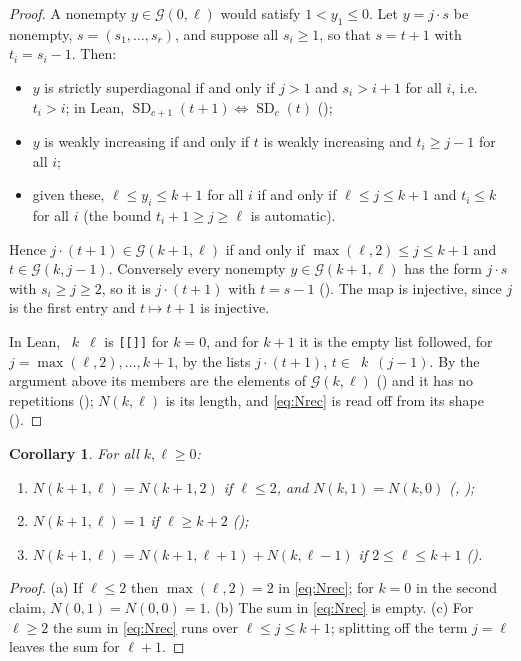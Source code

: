 \documentclass[11pt]{amsart}
\theoremstyle{plain}
\newtheorem{corollary}[theorem]{Corollary}
\theoremstyle{definition}
\newcommand{\G}{\mathcal{G}}
\begin{document}
\begin{proof}
A nonempty $y\in\G(0,\ell)$ would satisfy $1<y_1\le0$. Let $y=j\cdot s$ be nonempty, $s=(s_1,\dots,s_r)$, and suppose all $s_i\ge1$, so that $s=t+1$ with $t_i=s_i-1$. Then:
\begin{itemize}
\item $y$ is strictly superdiagonal if and only if $j>1$ and $s_i>i+1$ for all $i$, i.e.\ $t_i>i$; in Lean, $\operatorname{SD}_{c+1}(t+1)\iff\operatorname{SD}_c(t)$ ();
\item $y$ is weakly increasing if and only if $t$ is weakly increasing and $t_i\ge j-1$ for all $i$;
\item given these, $\ell\le y_i\le k+1$ for all $i$ if and only if $\ell\le j\le k+1$ and $t_i\le k$ for all $i$ (the bound $t_i+1\ge j\ge\ell$ is automatic).
\end{itemize}
Hence $j\cdot(t+1)\in\G(k+1,\ell)$ if and only if $\max(\ell,2)\le j\le k+1$ and $t\in\G(k,j-1)$. Conversely every nonempty $y\in\G(k+1,\ell)$ has the form $j\cdot s$ with $s_i\ge j\ge2$, so it is $j\cdot(t+1)$ with $t=s-1$ (). The map is injective, since $j$ is the first entry and $t\mapsto t+1$ is injective.

In Lean, ~$k$~$\ell$ is \texttt{[[]]} for $k=0$, and for $k+1$ it is the empty list followed, for $j=\max(\ell,2),\dots,k+1$, by the lists $j\cdot(t+1)$, $t\in{}$~$k$~$(j-1)$. By the argument above its members are the elements of $\G(k,\ell)$ () and it has no repetitions (); $N(k,\ell)$ is its length, and \eqref{eq:Nrec} is read off from its shape ().
\end{proof}

\begin{corollary}\label{cor:N}
For all $k,\ell\ge0$:
\begin{enumerate}
\item[(a)] $N(k+1,\ell)=N(k+1,2)$ if $\ell\le2$, and $N(k,1)=N(k,0)$ \quad(, );
\item[(b)] $N(k+1,\ell)=1$ if $\ell\ge k+2$ \quad();
\item[(c)] $N(k+1,\ell)=N(k+1,\ell+1)+N(k,\ell-1)$ if $2\le\ell\le k+1$ \quad().
\end{enumerate}
\end{corollary}

\begin{proof}
(a) If $\ell\le2$ then $\max(\ell,2)=2$ in \eqref{eq:Nrec}; for $k=0$ in the second claim, $N(0,1)=N(0,0)=1$. (b) The sum in \eqref{eq:Nrec} is empty. (c) For $\ell\ge2$ the sum in \eqref{eq:Nrec} runs over $\ell\le j\le k+1$; splitting off the term $j=\ell$ leaves the sum for $\ell+1$.
\end{proof}
\end{document}
